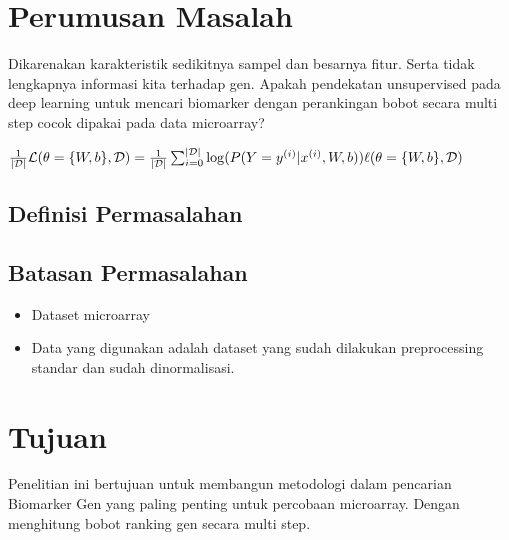 





\section{Perumusan Masalah}
Dikarenakan karakteristik sedikitnya sampel dan besarnya fitur. Serta tidak lengkapnya informasi kita terhadap gen. Apakah pendekatan unsupervised pada deep learning untuk mencari biomarker dengan perankingan bobot secara multi step cocok dipakai pada data microarray?

$ \frac{1}{|\mathcal{D}|} \mathcal{L} (\theta=\{W,b\}, \mathcal{D}) = \frac{1}{|\mathcal{D}|} \sum_{i=0}^{|\mathcal{D}|} \log(P(Y=y^{(i)}|x^{(i)}, W,b)) \\
\ell (\theta=\{W,b\}, \mathcal{D}) $


\subsection{Definisi Permasalahan}


\subsection{Batasan Permasalahan}
\begin{itemize}
\item Dataset microarray
\item Data yang digunakan adalah dataset yang sudah dilakukan preprocessing standar dan sudah dinormalisasi.
\end{itemize}

\section{Tujuan}
Penelitian ini bertujuan untuk membangun metodologi dalam pencarian Biomarker Gen yang paling penting untuk percobaan microarray. Dengan menghitung bobot ranking gen secara multi step.

